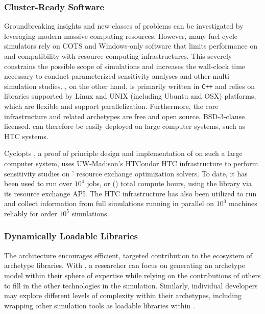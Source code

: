 \subsubsection{Cluster-Ready Software}

Groundbreaking insights and new classes of problems can be investigated by
leveraging modern massive computing resources.
However, many fuel cycle simulators rely on \gls{COTS} and Windows-only software that limits
performance on and compatibility with resource computing infrastructures. This
severely constrains the possible scope of simulations and increases the wall-clock time necessary to conduct parameterized sensitivity
analyses and other multi-simulation studies. \Cyclus, on the other hand, is
primarily written in \texttt{C++} and relies on
libraries supported by Linux and UNIX (including Ubuntu and OSX) platforms,
which are flexible and support parallelization.
Furthermore, the core infrastructure and related archetypes are free and
open source, BSD-3-clause licensed.  \Cyclus can therefore be easily deployed
on large computer systems, such as \gls{HTC} systems.

Cyclopts \cite{gidden_cyclopts_2015}, a proof of principle design and
implementation of \Cyclus on such a large computer system, uses UW-Madison's
HTCondor \gls{HTC} infrastructure to perform sensitivity studies on \Cyclus'
resource exchange optimization solvers. To date, it has been used to run over
$10^4$ jobs, or () total compute hours, using the \Cyclus
library via its resource exchange \gls{API}.  The \gls{HTC} infrastructure has
also been utilized to run and collect information from full \Cyclus simulations
running in parallel on $10^3$ machines reliably for order $10^5$ simulations.

\subsubsection{Dynamically Loadable Libraries}

The \Cyclus architecture encourages efficient, targeted contribution to the ecosystem of
archetype libraries.
With \Cyclus, a researcher can focus on generating an archetype model within their
sphere of expertise while relying on the contributions of others to fill
in the other technologies in the simulation.
Similarly, individual developers may explore different levels of complexity within their archetypes, including
wrapping other simulation tools as loadable libraries within \Cyclus.

